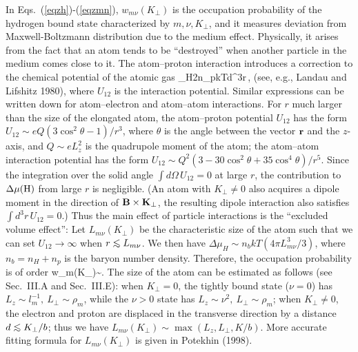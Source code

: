 In Eqs.~(\ref{eqzh})-(\ref{eqzmn}), $w_{m\nu}(K_\perp)$ is the 
occupation probability of the hydrogen bound state characterized by
$m,\nu,K_\perp$, and it measures deviation from Maxwell-Boltzmann distribution
due to the medium effect. Physically, it arises from the fact that an atom
tends to be ``destroyed'' when another particle in the medium comes close
to it. The atom--proton interaction introduces
a correction to the chemical potential of the atomic gas
\be
\Delta\mu_H\simeq 2n_pkT\!\int\!\!d^3r\,,
\ee
(see, e.g., Landau and Lifshitz 1980), where $U_{12}$ is the interaction 
potential. Similar expressions can be written down for atom--electron
and atom--atom interactions. For $r$ much larger than the size
of the elongated atom, the atom--proton potential $U_{12}$ has the form
$U_{12}\sim eQ(3\cos^2\theta-1)/r^3$, where $\theta$ is the angle between
the vector ${\bf r}$ and the $z$-axis, and $Q\sim eL_z^2$ is the quadrupole 
moment of the atom; the atom--atom interaction potential has the form
$U_{12}\sim Q^2(3-30\cos^2\theta+35\cos^4\theta)/r^5$.
Since the integration over the solid angle $\int\!d\Omega\, U_{12}=0$ at large
$r$, the contribution to $\Delta\mu({\rm H})$ from large $r$
is negligible. (An atom with $K_\perp\ne 0$ also acquires a dipole
moment in the direction of ${\bf B}\times {\bf K}_\perp$, the resulting dipole
interaction also satisfies $\int\!d^3r\,U_{12}=0$.)
Thus the main effect of particle interactions is the ``excluded volume
effect'': Let $L_{m\nu}(K_\perp)$ be the characteristic size of the atom
such that we can set $U_{12}\rightarrow\infty$ when $r\lo L_{m\nu}$. 
We then have $\Delta\mu_H\sim n_bkT (4\pi L_{m\nu}^3/3)$, where $n_b
=n_H+n_p$ is the baryon number density. Therefore, 
the occupation probability is of order
\be
w_{m\nu}(K_\perp)\sim \exp{}.
\ee
The size of the atom can be estimated as follows
(see Sec.~III.A and Sec.~III.E):  when $K_\perp=0$, the tightly bound state
($\nu=0$) has $L_z\sim l_m^{-1},~L_\perp\sim\rho_m$, while the $\nu>0$ state
has $L_z\sim \nu^2,~L_\perp\sim\rho_m$; when $K_\perp\ne 0$, 
the electron and proton are displaced in the transverse direction by 
a distance $d\lo K_\perp/b$; thus we have $L_{m\nu}(K_\perp)\sim
\max(L_z,L_\perp,K/b)$. More accurate fitting formula for $L_{m\nu}(K_\perp)$
is given in Potekhin (1998). 


